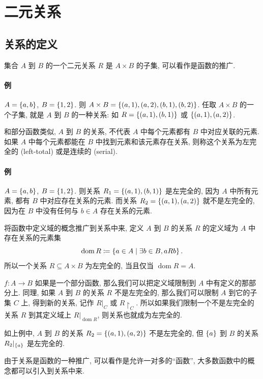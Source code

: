 \documentclass[UTF8]{ctexart}
\theoremstyle{mystyle}
\theoremstyle{myremark}
\theoremstyle{plain}
\DeclarePairedDelimiter\set{\{}{\}}
\DeclareMathOperator{\dom}{dom}
\begin{document}
\section{二元关系}
\subsection{关系的定义}
集合 $ A $ 到 $ B $ 的一个二元关系 $ R $ 是 $ A \times B $ 的子集, 可以看作是函数的推广.

\paragraph{例}
$ A = \set{a, b} $, $ B = \set{1, 2} $. 则 $ A \times B = \set{(a, 1), (a, 2), (b, 1), (b, 2)} $. 任取 $ A \times B $ 的一个子集, 就是 $ A $ 到 $ B $ 的一种关系: 如 $ R = \set{(a, 1), (b, 1)} $ 或 $ \set{(a, 1), (a, 2)} $.

和部分函数类似, $ A $ 到 $ B $ 的关系, 不代表 $ A $ 中每个元素都有 $ B $ 中对应关联的元素. 如果 $ A $ 中每个元素都能在 $ B $ 中找到元素和该元素存在关系, 则称这个关系为左完全的 (left-total) 或是连续的 (serial). 

\paragraph{例}
$ A = \set{a, b} $, $ B = \set{1, 2} $. 则关系 $ R_1 = \set{(a, 1), (b, 1)} $ 是左完全的, 因为 $ A $ 中所有元素, 都有 $ B $ 中对应存在关系的元素. 而关系 $ R_2 = \set{(a, 1), (a, 2)} $ 就不是左完全的, 因为在 $ B $ 中没有任何与 $ b \in A $ 存在关系的元素.

将函数中定义域的概念推广到关系中来, 定义 $ A $ 到 $ B $ 的关系 $ R $ 的定义域为 $ A $ 中存在关系的元素集
\[ 
    \dom R \coloneqq \set{a \in A \mid \exists b \in B, a R b }\,.
\]
所以一个关系 $ R \subseteq A \times B $ 为左完全的, 当且仅当 $ \dom R = A $.

$ f \colon A \to B $ 如果是一个部分函数, 那么我们可以把定义域限制到 $ A $ 中有定义的那部分上. 同理, 如果 $ A $ 到 $ B $ 的关系 $ R $ 不是左完全的, 那么我们可以限制 $ A $ 到它的子集 $ C $ 上, 得到新的关系, 记作 $ R|_C $ 或 $ R \restriction _C $. 所以如果我们限制一个不是左完全的关系 $ R $ 到其定义域上 $ R|_{\dom R} $, 则关系也就成为左完全的.

如上例中, $ A $ 到 $ B $ 的关系 $ R_2 = \set{(a, 1), (a, 2)} $ 不是左完全的, 但 $ \set{a} $ 到 $ B $ 的关系 $ R_2 |_{\set{a}} $ 是左完全的.

由于关系是函数的一种推广, 可以看作是允许一对多的``函数'', 大多数函数中的概念都可以引入到关系中来.
\end{document}
